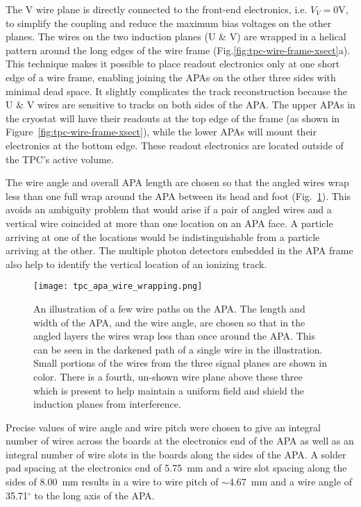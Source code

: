 The V wire plane is directly connected to the front-end electronics, i.e. $V_V=0$V, to simplify the coupling and 
reduce the maximum bias voltages on the other planes. The wires on the two induction planes (U \& V) are wrapped in a helical pattern around the long edges of the wire frame 
(Fig.\ref{fig:tpc-wire-frame-xsect}a). This technique makes it possible to place readout 
electronics only at one short edge of a wire frame, enabling joining the APAs on the other three sides with minimal dead space.  It slightly complicates 
the track reconstruction because the U \& V wires are sensitive to tracks on 
both sides of the APA.  The upper APAs in the cryostat will have their readouts
at the top edge of the frame (as shown in Figure~\ref{fig:tpc-wire-frame-xsect}), 
while the lower APAs will mount their electronics at the bottom edge.  These readout electronics are located outside of the TPC's active volume.

The wire angle and overall APA length are chosen so that the angled wires wrap less than one full wrap around the APA between its head and foot (Fig.~\ref{fig:tpc-wire-angle}).  This avoids an ambiguity problem that would arise if a pair of angled wires and a vertical wire coincided at more than one location on an APA face.  A particle arriving at one of the locations would be indistinguishable from a particle arriving at the other.  The multiple photon detectors embedded in the APA frame also help to identify the vertical location of an ionizing track.

\begin{figure}[htbp]
\centering
\texttt{[image: tpc\_apa\_wire\_wrapping.png]}
\caption[TPC APA wire wrapping illustration]{An illustration of a few wire paths on the APA.  The length and width of the APA, and the wire angle, are chosen so that in the angled layers the wires wrap less than once around the APA.  This can be seen in the darkened path of a single wire in the illustration.  Small portions of the wires from the three signal planes are shown in color.  There is a fourth, un-shown wire plane above these three which is present to help maintain a uniform field and shield the induction planes from interference. }
\label{fig:tpc-wire-angle}
\end{figure}


Precise values of wire angle and wire pitch were chosen to give an integral number of wires across the boards at the electronics end of the APA as well as an integral number of wire slots in the boards along the sides of the APA.  A solder pad spacing at the electronics end of 5.75~mm and a wire slot spacing along the sides of 8.00~mm results in a wire to wire pitch of $\sim$4.67~mm and a wire angle of 35.71$^\circ$ to the long axis of the APA.


